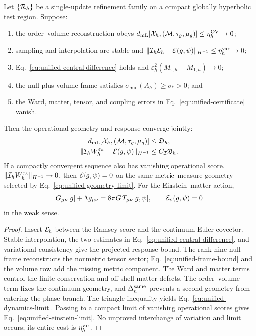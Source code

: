 \begin{theorem}
\label{thm:unified-operational-continuum}
Let \(\{{\cal R}_h\}\) be a single-update refinement family on a compact
globally hyperbolic test region.  Suppose:
\begin{enumerate}[label=(U\arabic*)]
\item the order--volume reconstruction obeys
\(d_{\mathrm{mL}}[{\cal X}_h,({\cal M},\tau_g,\mu_g)]
\le\eta_h^{\rm OV}\to0\);
\item sampling and interpolation are stable and
\(\|{\cal I}_h{\cal E}_h-{\cal E}(g,\psi)\|_{H^{-1}}
\le\eta_h^{\rm var}\to0\);
\item Eq.~\eqref{eq:unified-central-difference} holds and
\(\varepsilon_h^2(M_{0,h}+M_{1,h})\to0\);
\item the null-plus-volume frame satisfies
\(\sigma_{\min}(A_h)\ge\sigma_*>0\); and
\item the Ward, matter, tensor, and coupling errors in
Eq.~\eqref{eq:unified-certificate} vanish.
\end{enumerate}
Then the operational geometry and response converge jointly:
\begin{align}
 d_{\mathrm{mL}}[{\cal X}_h,({\cal M},\tau_g,\mu_g)]
 &\le {\mathfrak D}_h,\label{eq:unified-geometry-limit}\\
 \|{\cal I}_hW_h^{\varepsilon_h}-{\cal E}(g,\psi)\|_{H^{-1}}
 &\le C_{\cal I}{\mathfrak D}_h .
 \label{eq:unified-dynamics-limit}
\end{align}
If a compactly convergent sequence also has vanishing operational score,
\(\|{\cal I}_hW_h^{\varepsilon_h}\|_{H^{-1}}\to0\), then
\({\cal E}(g,\psi)=0\) on the same metric--measure geometry selected by
Eq.~\eqref{eq:unified-geometry-limit}.  For the Einstein--matter action,
\begin{equation}
 G_{\mu\nu}[g]+\Lambda g_{\mu\nu}
 =8\pi G\,T_{\mu\nu}[g,\psi],
 \qquad {\cal E}_{\psi}(g,\psi)=0
 \label{eq:unified-einstein-limit}
\end{equation}
in the weak sense.
\end{theorem}

\begin{proof}
Insert \({\cal E}_h\) between the Ramsey score and the continuum Euler
covector.  Stable interpolation, the two estimates in
Eq.~\eqref{eq:unified-central-difference}, and variational consistency give
the projected response bound.  The rank-nine null frame reconstructs the
nonmetric tensor sector; Eq.~\eqref{eq:unified-frame-bound} and the volume
row add the missing metric component.  The Ward and matter terms control the
finite conservation and off-shell matter defects.  The order--volume term
fixes the continuum geometry, and
\(\Delta_h^{\rm same}\) prevents a second geometry from entering the phase
branch.  The triangle inequality yields
Eq.~\eqref{eq:unified-dynamics-limit}.  Passing to a compact limit of
vanishing operational scores gives
Eq.~\eqref{eq:unified-einstein-limit}.  No unproved interchange of
variation and limit occurs; its entire cost is \(\eta_h^{\rm var}\).
\end{proof}

